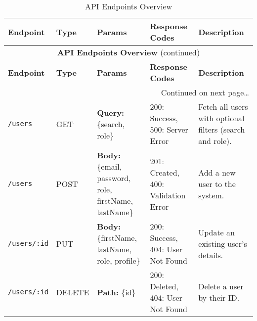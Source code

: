 \begin{landscape}

\scriptsize
\renewcommand{\arraystretch}{1.1} %

\begin{longtable}{|
  p{3cm}|
  p{1.6cm}|
  p{5.0cm}|
  p{5.0cm}|
  p{8.0cm}|
}
\caption{API Endpoints Overview}
\label{tab:api_endpoints} \\

\hline
\textbf{Endpoint} & \textbf{Type} & \textbf{Params} & \textbf{Response Codes} & \textbf{Description} \\ 
\hline
\endfirsthead

\multicolumn{5}{c}{\textbf{API Endpoints Overview} (continued)} \\[6pt]
\hline
\textbf{Endpoint} & \textbf{Type} & \textbf{Params} & \textbf{Response Codes} & \textbf{Description} \\
\hline
\endhead

\hline
\multicolumn{5}{r}{\scriptsize Continued on next page\ldots}\\
\endfoot

\hline
\endlastfoot


\texttt{/users} &
GET &
\textbf{Query:} \{search, role\} &
200: Success, 500: Server Error &
Fetch all users with optional filters (search and role).\\ \hline

\texttt{/users} &
POST &
\textbf{Body:} \{email, password, role, firstName, lastName\} &
201: Created, 400: Validation Error &
Add a new user to the system.\\ \hline

\texttt{/users/:id} &
PUT &
\textbf{Body:} \{firstName, lastName, role, profile\} &
200: Success, 404: User Not Found &
Update an existing user's details.\\ \hline

\texttt{/users/:id} &
DELETE &
\textbf{Path:} \{id\} &
200: Deleted, 404: User Not Found &
Delete a user by their ID.\\ \hline


\end{longtable}
\end{landscape}
